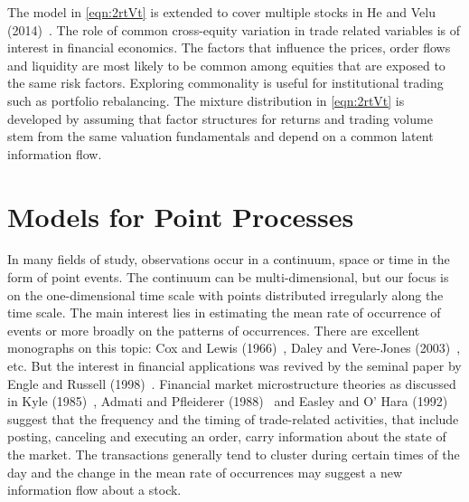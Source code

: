 The model in \eqref{eqn:2rtVt} is extended to cover multiple stocks in He and Velu (2014)~\cite{hevelu}. The role of common cross-equity variation in trade related variables is of interest in financial economics. The factors that influence the prices, order flows and liquidity are most likely to be common among equities that are exposed to the same risk factors. Exploring commonality is useful for institutional trading such as portfolio rebalancing. The mixture distribution in \eqref{eqn:2rtVt} is developed by assuming that factor structures for returns and trading volume stem from the same valuation fundamentals and depend on a common latent information flow.  



\section{Models for Point Processes}


In many fields of study, observations occur in a continuum, space or time in the form of point events. The continuum can be multi-dimensional, but our focus is on the one-dimensional time scale with points distributed irregularly along the time scale. The main interest lies in estimating the mean rate of occurrence of events or more broadly on the patterns of occurrences. There are excellent monographs on this topic: Cox and Lewis (1966)~\cite{cox1966}, Daley and Vere-Jones (2003)~\cite{daley2003}, etc. But the interest in financial applications was revived by the seminal paper by Engle and Russell (1998)~\cite{engle1998}. Financial market microstructure theories as discussed in Kyle (1985)~\cite{kyle1985}, Admati and Pfleiderer (1988)~\cite{admati1988theory} and Easley and O' Hara (1992)~\cite{easley1992} suggest that the frequency and the timing of trade-related activities, that include posting, canceling and executing an order, carry information about the state of the market. The transactions generally tend to cluster during certain times of the day and the change in the mean rate of occurrences may suggest a new information flow about a stock.


